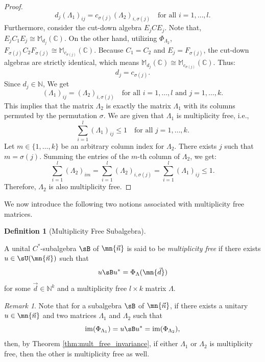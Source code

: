 \documentclass[12pt,a4paper]{amsart}
\theoremstyle{plain}
\theoremstyle{definition}
\newtheorem{definition}[theorem]{Definition}
\theoremstyle{remark}
\newtheorem{remark}[theorem]{Remark}
\numberwithin{equation}{section}
\theoremstyle{ser}
\theoremstyle{serr}
\theoremstyle{ser}
\theoremstyle{ser}
\theoremstyle{collabquestion}
\newcommand{\N}{\mathbb{N}}
\newcommand{\<}{\langle}
\renewcommand{\>}{\rangle}
\begin{document}
\begin{proof}
    $$d_j (\Lambda_1)_{ij} = c_{\sigma(j)} (\Lambda_2)_{i, \sigma(j)} \quad \text{for all } i=1, \dots, l.$$
    Furthermore, consider the cut-down algebra $E_j C E_j$. Note that, $E_j C_1 E_j \cong \mathbb{M}_{d_j}(\mathbb{C})$. On the other hand, utilizing $\Phi_{\Lambda_2}$, $F_{\sigma(j)} C_2 F_{\sigma(j)} \cong \mathbb{M}_{c_{\sigma(j)}}(\mathbb{C})$. Because $C_1 = C_2$ and $E_j = F_{\sigma(j)}$, the cut-down algebras are strictly identical, which means $\mathbb{M}_{d_j}(\mathbb{C}) \cong \mathbb{M}_{c_{\sigma(j)}}(\mathbb{C})$. Thus:$$d_j = c_{\sigma(j)}.$$
    Since $d_j \in \mathbb{N}$, We get $$(\Lambda_1)_{ij} = (\Lambda_2)_{i, \sigma(j)} \quad \text{for all } i=1,\dots,l \text{ and } j=1,\dots,k.$$ This implies that the matrix $\Lambda_2$ is exactly the matrix $\Lambda_1$ with its columns permuted by the permutation $\sigma$. We are given that $\Lambda_1$ is multiplicity free, i.e., 
    $$\sum_{i=1}^l (\Lambda_1)_{ij} \leq 1 \quad \text{for all } j=1,\dots,k.$$Let $m \in \{1,\dots,k\}$ be an arbitrary column index for $\Lambda_2$. There exists $j$ such that $m = \sigma(j)$. Summing the entries of the $m$-th column of $\Lambda_2$, we get:$$\sum_{i=1}^l (\Lambda_2)_{im} = \sum_{i=1}^l (\Lambda_2)_{i, \sigma(j)} = \sum_{i=1}^l (\Lambda_1)_{ij} \leq 1.$$Therefore, $\Lambda_2$ is also multiplicity free.
\end{proof}


We now introduce the following two notions associated with multiplicity free matrices.

\begin{definition}[Multiplicity Free Subalgebra]
\label{def:mult_free_subalg}

A unital $C^*$-subalgebra $\sB$ of $\mn{\vec{n}}$ is said to be \emph{multiplicity free} if there exists $u \in \sU(\mn{\vec{n}})$ such that
\[
u\sB u^* = \Phi_{\Lambda}(\mn{\vec{d}})
\]
for some $\vec{d} \in \N^k$ and a multiplicity free $l \times k$ matrix $\Lambda$.
\end{definition}


\begin{remark}
    Note that for a subalgebra $\sB$ of $\mn{\vec{n}}$, if there exists a unitary $u \in \mn{\vec{n}}$ and two matrices $\Lambda_1$ and $\Lambda_2$ such that
\[
\operatorname{im}(\Phi_{\Lambda_1})
= u\sB u^*
= \operatorname{im}(\Phi_{\Lambda_2}),
\]
then, by Theorem \ref{thm:mult_free_invariance}, if either $\Lambda_1$ or $\Lambda_2$ is multiplicity free, then the other is multiplicity free as well.
\end{remark}
\end{document}
